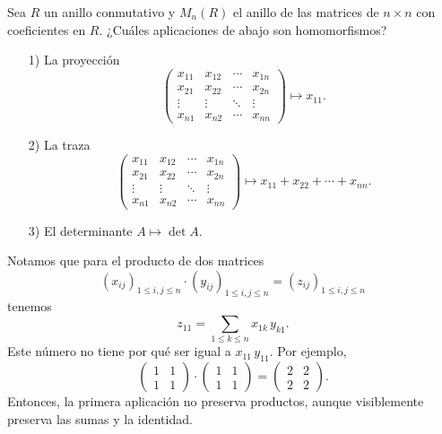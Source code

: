 \begin{ejercicio}
  Sea $R$ un anillo conmutativo y $M_n (R)$ el anillo de las matrices
  de $n\times n$ con coeficientes en $R$. ¿Cuáles aplicaciones de abajo
  son homomorfismos?

  \begin{enumerate}
  \item[1)] La proyección
    $$\begin{pmatrix}
      x_{11} & x_{12} & \cdots & x_{1n} \\
      x_{21} & x_{22} & \cdots & x_{2n} \\
      \vdots & \vdots & \ddots & \vdots \\
      x_{n1} & x_{n2} & \cdots & x_{nn}
    \end{pmatrix} \mapsto x_{11}.$$

  \item[2)] La traza
    $$\begin{pmatrix}
      x_{11} & x_{12} & \cdots & x_{1n} \\
      x_{21} & x_{22} & \cdots & x_{2n} \\
      \vdots & \vdots & \ddots & \vdots \\
      x_{n1} & x_{n2} & \cdots & x_{nn}
    \end{pmatrix} \mapsto x_{11} + x_{22} + \cdots + x_{nn}.$$

  \item[3)] El determinante $A \mapsto \det A$.
  \end{enumerate}

  \ifdefined\solutions
  \begin{solucion}
    Notamos que para el producto de dos matrices
    \[ (x_{ij})_{1 \le i,j\le n}\cdot (y_{ij})_{1 \le i,j\le n} =
       (z_{ij})_{1 \le i,j\le n}\]
    tenemos
    $$z_{11} = \sum_{1\le k\le n} x_{1k}\,y_{k1}.$$
    Este número no tiene por qué ser igual a $x_{11}\,y_{11}$. Por ejemplo,
    $$\begin{pmatrix}
      1 & 1 \\
      1 & 1
    \end{pmatrix}\cdot \begin{pmatrix}
      1 & 1 \\
      1 & 1
    \end{pmatrix} = \begin{pmatrix}
      2 & 2 \\
      2 & 2
    \end{pmatrix}.$$
    Entonces, la primera aplicación no preserva productos, aunque visiblemente
    preserva las sumas y la identidad.


\end{solucion}
\end{ejercicio}

